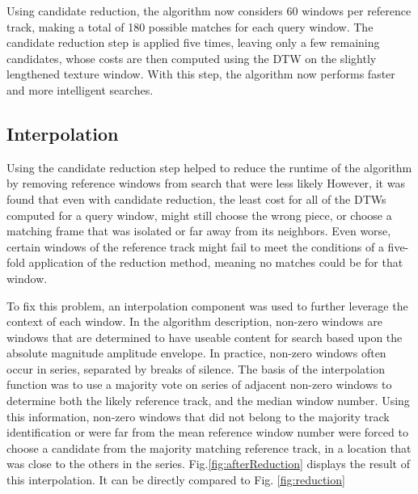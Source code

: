 \documentclass{article}
\begin{document}
Using candidate reduction, the algorithm now considers 60 windows per reference track, making a total of 180 possible matches for each query window. The candidate reduction step is applied five times, leaving only a few remaining candidates, whose costs are then computed using the DTW on the slightly lengthened texture window. With this step, the algorithm now performs faster and more intelligent searches.

\subsection{Interpolation}

Using the candidate reduction step helped to reduce the runtime of the algorithm by removing reference windows from search that were less likely However, it was found that even with candidate reduction, the least cost for all of the DTWs computed for a query window, might still choose the wrong piece, or choose a matching frame that was isolated or far away from its neighbors. Even worse, certain windows of the reference track might fail to meet the conditions of a five-fold application of the reduction method, meaning no matches could be for that window.  

To fix this problem, an interpolation component was used to further leverage the context of each window. In the algorithm description, non-zero windows are windows that are determined to have useable content for search based upon the absolute magnitude amplitude envelope.  In practice, non-zero windows often occur in series, separated by breaks of silence. The basis of the interpolation function was to use a majority vote on series of adjacent non-zero windows to determine both the likely reference track, and the median window number. Using this information, non-zero windows that did not belong to the majority track identification or were far from the mean reference window number were forced to choose a candidate from the majority matching reference track, in a location that was close to the others in the series. Fig.\ref{fig:afterReduction} displays the result of this interpolation. It can be directly compared to Fig. \ref{fig:reduction}
\end{document}
